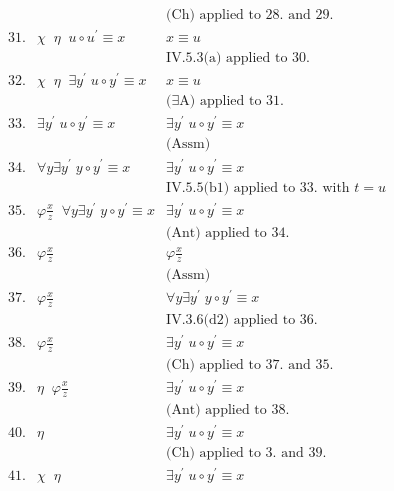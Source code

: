 \begin{enumerate}[1.]
\[\begin{array}{lll}
\   & \                                       & \mbox{(Ch) applied to 28. and 29.} \\
31. & \chi \;\; \eta \;\; u \circ u^\prime \equiv x & x \equiv u \\
\   & \                                       & \mbox{IV.5.3(a) applied to 30.} \\
32. & \chi \;\; \eta \;\; \exists y^\prime \; u \circ y^\prime \equiv x & x \equiv u \\
\   & \                                       & \mbox{($\exists$A) applied to 31.} \\
33. & \exists y^\prime \; u \circ y^\prime \equiv x & \exists y^\prime \; u \circ y^\prime \equiv x \\
\   & \                                       & \mbox{(Assm)} \\
34. & \forall y \exists y^\prime \; y \circ y^\prime \equiv x & \exists y^\prime \; u \circ y^\prime \equiv x \\
\   & \                                       & \mbox{IV.5.5(b1) applied to 33. with $t = u$} \\
35. & \varphi\frac{x}{z} \;\; \forall y \exists y^\prime \; y \circ y^\prime \equiv x & \exists y^\prime \; u \circ y^\prime \equiv x \\
\   & \                                       & \mbox{(Ant) applied to 34.} \\
36. & \varphi\frac{x}{z} & \varphi\frac{x}{z} \\
\   & \          & \mbox{(Assm)} \\
37. & \varphi\frac{x}{z} & \forall y \exists y^\prime \; y \circ y^\prime \equiv x \\
\   & \          & \mbox{IV.3.6(d2) applied to 36.} \\
38. & \varphi\frac{x}{z} & \exists y^\prime \; u \circ y^\prime \equiv x \\
\   & \                                       & \mbox{(Ch) applied to 37. and 35.} \\
39. & \eta \;\; \varphi\frac{x}{z} & \exists y^\prime \; u \circ y^\prime \equiv x \\
\   & \                                       & \mbox{(Ant) applied to 38.} \\
40. & \eta & \exists y^\prime \; u \circ y^\prime \equiv x \\
\   & \                                       & \mbox{(Ch) applied to 3. and 39.} \\
41. & \chi \;\; \eta & \exists y^\prime \; u \circ y^\prime \equiv x \\

\end{array}\]
\end{enumerate}
